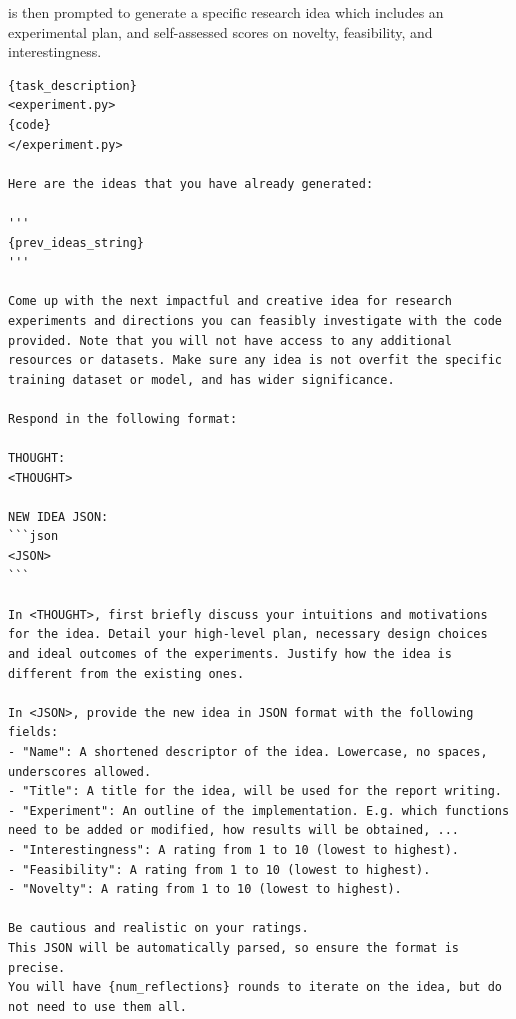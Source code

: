 \begin{appendices}
\ouralgo is then prompted to generate a specific research idea which includes an experimental plan, and self-assessed scores on novelty, feasibility, and interestingness.
\begin{tcolorbox}[breakable, colback=orange!5!white, colframe=orange!80!black, title=Idea Generation Prompt]
\begin{Verbatim}[breaklines, breaksymbol={}, breaksymbolleft={}, fontsize=\small]
{task_description}
<experiment.py>
{code}
</experiment.py>

Here are the ideas that you have already generated:

'''
{prev_ideas_string}
'''

Come up with the next impactful and creative idea for research experiments and directions you can feasibly investigate with the code provided. Note that you will not have access to any additional resources or datasets. Make sure any idea is not overfit the specific training dataset or model, and has wider significance.

Respond in the following format:

THOUGHT:
<THOUGHT>

NEW IDEA JSON:
```json
<JSON>
```

In <THOUGHT>, first briefly discuss your intuitions and motivations for the idea. Detail your high-level plan, necessary design choices and ideal outcomes of the experiments. Justify how the idea is different from the existing ones.

In <JSON>, provide the new idea in JSON format with the following fields:
- "Name": A shortened descriptor of the idea. Lowercase, no spaces, underscores allowed.
- "Title": A title for the idea, will be used for the report writing.
- "Experiment": An outline of the implementation. E.g. which functions need to be added or modified, how results will be obtained, ...
- "Interestingness": A rating from 1 to 10 (lowest to highest).
- "Feasibility": A rating from 1 to 10 (lowest to highest).
- "Novelty": A rating from 1 to 10 (lowest to highest).

Be cautious and realistic on your ratings.
This JSON will be automatically parsed, so ensure the format is precise.
You will have {num_reflections} rounds to iterate on the idea, but do not need to use them all.
\end{Verbatim}
\end{tcolorbox}


\end{appendices}
